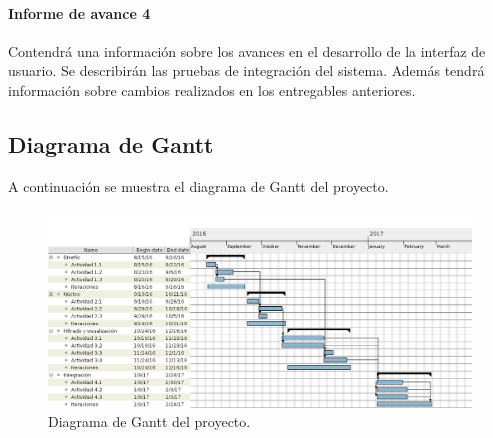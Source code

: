 \paragraph{Informe de avance 4}
Contendrá una información sobre los avances en el desarrollo de la interfaz de usuario. Se describirán las pruebas de integración del sistema. Además tendrá información sobre cambios realizados en los entregables anteriores.


\subsection*{Diagrama de Gantt}

A continuación se muestra el diagrama de Gantt del proyecto.

\begin{figure}[htbp!]
	\includegraphics[scale=.4]{gantt_png}
	\caption{Diagrama de Gantt del proyecto.}
	\label{fig:gantt}
\end{figure}